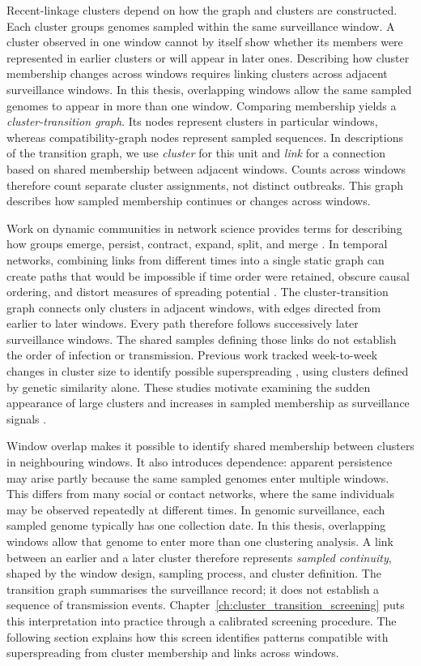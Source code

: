 Recent-linkage clusters depend on how the graph and clusters are constructed. Each cluster groups genomes sampled within the same surveillance window. A cluster observed in one window cannot by itself show whether its members were represented in earlier clusters or will appear in later ones. Describing how cluster membership changes across windows requires linking clusters across adjacent surveillance windows. In this thesis, overlapping windows allow the same sampled genomes to appear in more than one window. Comparing membership yields a \emph{cluster-transition graph}. Its nodes represent clusters in particular windows, whereas compatibility-graph nodes represent sampled sequences. In descriptions of the transition graph, we use \emph{cluster} for this unit and \emph{link} for a connection based on shared membership between adjacent windows. Counts across windows therefore count separate cluster assignments, not distinct outbreaks. This graph describes how sampled membership continues or changes across windows.

Work on dynamic communities in network science provides terms for describing how groups emerge, persist, contract, expand, split, and merge \citep{Palla2007,Mucha2010,Saeed2025}. In temporal networks, combining links from different times into a single static graph can create paths that would be impossible if time order were retained, obscure causal ordering, and distort measures of spreading potential \citep{Holme2012,Kempe2002,Masuda2017}. The cluster-transition graph connects only clusters in adjacent windows, with edges directed from earlier to later windows. Every path therefore follows successively later surveillance windows. The shared samples defining those links do not establish the order of infection or transmission. Previous work tracked week-to-week changes in cluster size to identify possible superspreading \citep{dor2025}, using clusters defined by genetic similarity alone. These studies motivate examining the sudden appearance of large clusters and increases in sampled membership as surveillance signals \citep{GomezCarballa2021}.

Window overlap makes it possible to identify shared membership between clusters in neighbouring windows. It also introduces dependence: apparent persistence may arise partly because the same sampled genomes enter multiple windows. This differs from many social or contact networks, where the same individuals may be observed repeatedly at different times. In genomic surveillance, each sampled genome typically has one collection date. In this thesis, overlapping windows allow that genome to enter more than one clustering analysis. A link between an earlier and a later cluster therefore represents \emph{sampled continuity}, shaped by the window design, sampling process, and cluster definition. The transition graph summarises the surveillance record; it does not establish a sequence of transmission events. Chapter~\ref{ch:cluster_transition_screening} puts this interpretation into practice through a calibrated screening procedure. The following section explains how this screen identifies patterns compatible with superspreading from cluster membership and links across windows.

